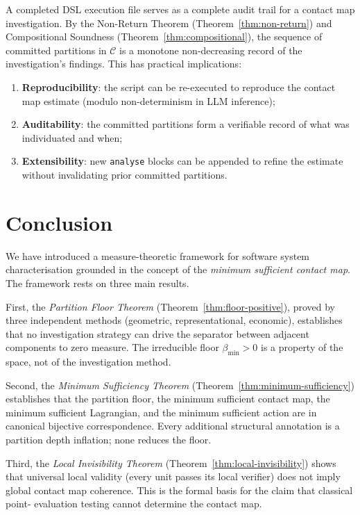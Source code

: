 \documentclass[12pt,a4paper,twocolumn]{article}
\theoremstyle{plain}
\theoremstyle{definition}
\theoremstyle{remark}
\newcommand{\bmin}{\beta_{\min}}
\begin{document}
A completed DSL execution file serves as a complete audit trail for a contact
map investigation.  By the Non-Return Theorem (Theorem~\ref{thm:non-return})
and Compositional Soundness (Theorem~\ref{thm:compositional}), the sequence of
committed partitions in $\mathcal{C}$ is a monotone non-decreasing record of
the investigation's findings.  This has practical implications:

\begin{enumerate}[label=(\roman*)]
  \item \textbf{Reproducibility}: the script can be re-executed to reproduce
    the contact map estimate (modulo non-determinism in LLM inference);
  \item \textbf{Auditability}: the committed partitions form a verifiable
    record of what was individuated and when;
  \item \textbf{Extensibility}: new \texttt{analyse} blocks can be appended
    to refine the estimate without invalidating prior committed partitions.
\end{enumerate}

\section{Conclusion}
\label{sec:conclusion}

We have introduced a measure-theoretic framework for software system
characterisation grounded in the concept of the \emph{minimum sufficient
contact map}.  The framework rests on three main results.

First, the \emph{Partition Floor Theorem} (Theorem~\ref{thm:floor-positive}),
proved by three independent methods (geometric, representational, economic),
establishes that no investigation strategy can drive the separator between
adjacent components to zero measure.  The irreducible floor $\bmin > 0$ is
a property of the space, not of the investigation method.

Second, the \emph{Minimum Sufficiency Theorem}
(Theorem~\ref{thm:minimum-sufficiency}) establishes that the partition floor,
the minimum sufficient contact map, the minimum sufficient Lagrangian, and
the minimum sufficient action are in canonical bijective correspondence.
Every additional structural annotation is a partition depth inflation; none
reduces the floor.

Third, the \emph{Local Invisibility Theorem}
(Theorem~\ref{thm:local-invisibility}) shows that universal local validity
(every unit passes its local verifier) does not imply global contact map
coherence.  This is the formal basis for the claim that classical point-
evaluation testing cannot determine the contact map.
\end{document}

